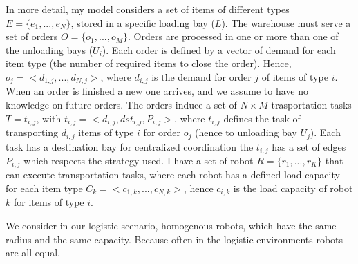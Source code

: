 In more detail, my model considers a set of items of different types $E = \{ e_1,...,e_N\}$,
stored in a specific loading bay ($L$). The warehouse must serve a set of orders 
$O=\{o_1,...,o_M\}$. Orders are processed in one or more than one of the unloading bays ($U_i$).
Each order is defined by a vector of demand for each item type (the number of required 
items to close the order). Hence, $o_j = < d_{1,j},...,d_{N,j}>$, where $d_{i,j}$ is the 
demand for order $j$ of items of type $i$. When an order is finished a new one arrives,
and we assume to have no knowledge on future orders.
The orders induce a set of $N \times M$ trasportation tasks $T = {t_{i,j}}$, with 
$t_{i,j} = < d_{i,j}, dst_{i,j}, P_{i,j}>$, where $t_{i,j}$ defines the task of transporting 
$d_{i,j}$ items of type $i$ for order $o_j$ (hence to unloading bay $U_j$).
Each task has a destination bay for centralized coordination the $t_{i,j}$ has a set of edges
$P_{i,j}$ which respects the strategy used. 
I have a set of robot $R = \{r_1,...,r_K \}$ that can execute transportation tasks, where
each robot has a defined load capacity for each item type $C_k = <c_{1,k},...,c_{N,k}>$, 
hence $c_{i,k}$ is the load capacity of robot $k$ for items of type $i$.

We consider in our logistic scenario, homogenous robots, which have the same radius 
and the same capacity. Because often in the logistic environments robots are all 
equal. 


